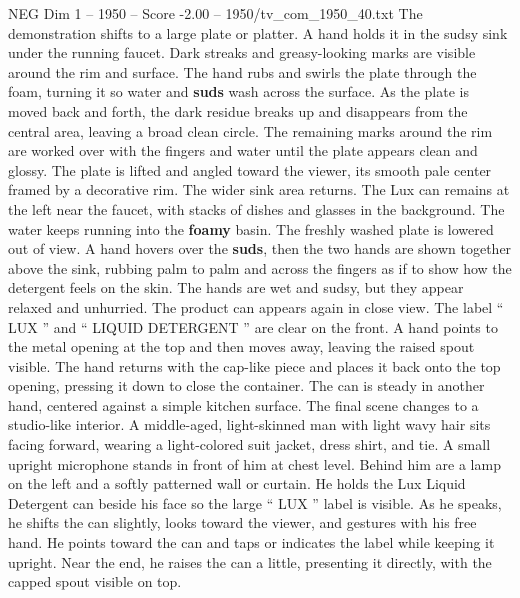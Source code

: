 \begin{textsample}{NEG Dim 1 – 1950 – Score -2.00 – 1950/tv\_com\_1950\_40.txt}
The demonstration shifts to a large plate or platter.
A hand holds it in the sudsy sink under the running faucet.
Dark streaks and greasy-looking marks are visible around the rim and surface.
The hand rubs and swirls the plate through the foam, turning it so water and \textbf{suds} wash across the surface.
As the plate is moved back and forth, the dark residue breaks up and disappears from the central area, leaving a broad clean circle.
The remaining marks around the rim are worked over with the fingers and water until the plate appears clean and glossy.
The plate is lifted and angled toward the viewer, its smooth pale center framed by a decorative rim.
The wider sink area returns.
The Lux can remains at the left near the faucet, with stacks of dishes and glasses in the background.
The water keeps running into the \textbf{foamy} basin.
The freshly washed plate is lowered out of view.
A hand hovers over the \textbf{suds}, then the two hands are shown together above the sink, rubbing palm to palm and across the fingers as if to show how the detergent feels on the skin.
The hands are wet and sudsy, but they appear relaxed and unhurried.
The product can appears again in close view.
The label “ LUX ” and “ LIQUID DETERGENT ” are clear on the front.
A hand points to the metal opening at the top and then moves away, leaving the raised spout visible.
The hand returns with the cap-like piece and places it back onto the top opening, pressing it down to close the container.
The can is steady in another hand, centered against a simple kitchen surface.
The final scene changes to a studio-like interior.
A middle-aged, light-skinned man with light wavy hair sits facing forward, wearing a light-colored suit jacket, dress shirt, and tie.
A small upright microphone stands in front of him at chest level.
Behind him are a lamp on the left and a softly patterned wall or curtain.
He holds the Lux Liquid Detergent can beside his face so the large “ LUX ” label is visible.
As he speaks, he shifts the can slightly, looks toward the viewer, and gestures with his free hand.
He points toward the can and taps or indicates the label while keeping it upright.
Near the end, he raises the can a little, presenting it directly, with the capped spout visible on top.

\end{textsample}
